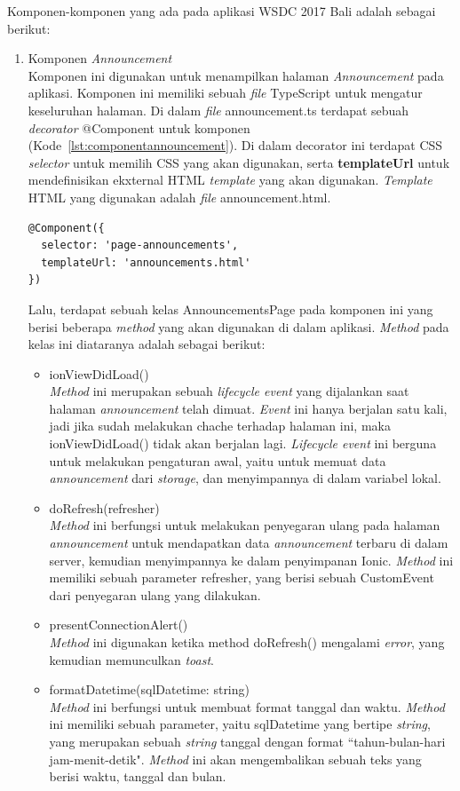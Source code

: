 Komponen-komponen yang ada pada aplikasi WSDC 2017 Bali adalah sebagai berikut:

\begin{enumerate}
	\item Komponen \textit{Announcement} \\
	Komponen ini digunakan untuk menampilkan halaman \textit{Announcement} pada aplikasi. Komponen ini memiliki sebuah \textit{file} TypeScript untuk mengatur keseluruhan halaman. Di dalam \textit{file} announcement.ts terdapat sebuah \textit{decorator} @Component untuk komponen (Kode~\ref{lst:componentannouncement}). Di dalam decorator ini terdapat CSS \textit{selector} untuk memilih CSS yang akan digunakan, serta \textbf{templateUrl} untuk mendefinisikan ekxternal HTML \textit{template} yang akan digunakan. \textit{Template} HTML yang digunakan adalah \textit{file} announcement.html. 
\begin{lstlisting}[label={lst:componentannouncement}, caption=@Component pada annoncement.ts]
@Component({
  selector: 'page-announcements',
  templateUrl: 'announcements.html'
})
\end{lstlisting} 
	Lalu, terdapat sebuah kelas AnnouncementsPage pada komponen ini yang berisi beberapa \textit{method} yang akan digunakan di dalam aplikasi. \textit{Method} pada kelas ini diataranya adalah sebagai berikut:
	\begin{itemize}
		\item ionViewDidLoad() \\
		\textit{Method} ini merupakan sebuah \textit{lifecycle event} yang dijalankan saat halaman \textit{announcement} telah dimuat. \textit{Event} ini hanya berjalan satu kali, jadi jika sudah melakukan chache terhadap halaman ini, maka ionViewDidLoad() tidak akan berjalan lagi. \textit{Lifecycle event} ini berguna untuk melakukan pengaturan awal, yaitu untuk memuat data \textit{announcement} dari \textit{storage}, dan menyimpannya di dalam variabel lokal. 
		\item doRefresh(refresher) \\
		\textit{Method} ini berfungsi untuk melakukan penyegaran ulang pada halaman \textit{announcement} untuk mendapatkan data \textit{announcement} terbaru di dalam server, kemudian menyimpannya ke dalam penyimpanan Ionic. \textit{Method} ini memiliki sebuah parameter refresher, yang berisi sebuah CustomEvent dari penyegaran ulang yang dilakukan.
		\item presentConnectionAlert() \\
		\textit{Method} ini digunakan ketika method doRefresh() mengalami \textit{error}, yang kemudian memunculkan \textit{toast}.
		\item formatDatetime(sqlDatetime: string) \\
		\textit{Method} ini berfungsi untuk membuat format tanggal dan waktu. \textit{Method} ini memiliki sebuah parameter, yaitu sqlDatetime yang bertipe \textit{string}, yang merupakan sebuah \textit{string} tanggal dengan format ``tahun-bulan-hari jam-menit-detik". \textit{Method} ini akan mengembalikan sebuah teks yang berisi waktu, tanggal dan bulan.
	\end{itemize}


\end{enumerate}
